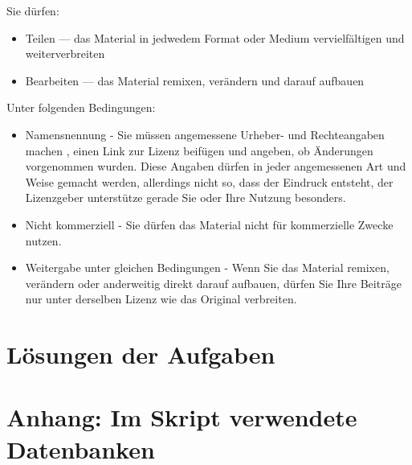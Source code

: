 \documentclass[a4paper,12pt, headsepline, ngerman]{scrartcl}
\begin{document}
	Sie dürfen:
	\begin{itemize}
		\item Teilen — das Material in jedwedem Format oder Medium vervielfältigen und weiterverbreiten
		\item Bearbeiten — das Material remixen, verändern und darauf aufbauen
	\end{itemize}
	Unter folgenden Bedingungen:
	\begin{itemize}
		\item Namensnennung - Sie müssen angemessene Urheber- und Rechteangaben machen , einen Link zur Lizenz beifügen und angeben, ob Änderungen vorgenommen wurden. Diese Angaben dürfen in jeder angemessenen Art und Weise gemacht werden, allerdings nicht so, dass der Eindruck entsteht, der Lizenzgeber unterstütze gerade Sie oder Ihre Nutzung besonders.
		\item Nicht kommerziell - Sie dürfen das Material nicht für kommerzielle Zwecke nutzen.
		\item Weitergabe unter gleichen Bedingungen - Wenn Sie das Material remixen, verändern oder anderweitig direkt darauf aufbauen, dürfen Sie Ihre Beiträge nur unter derselben Lizenz wie das Original verbreiten.
	\end{itemize}
	\newpage
	\tableofcontents
	\thispagestyle{empty}
	\newpage
	\def\pics{./pics}
	
	\newpage
	
	\newpage
	
	\newpage
	
	\newpage
	
	\newpage
	
	\newpage
	
	\newpage
	
	\newpage
	
	\newpage
	
	\newpage
	
	
	\newpage
	
	\newpage
	
    \newpage
    \section{Lösungen der Aufgaben}
    \shipoutAnswer
    \newpage
    \section{Anhang: Im Skript verwendete Datenbanken}
    
\end{document}
